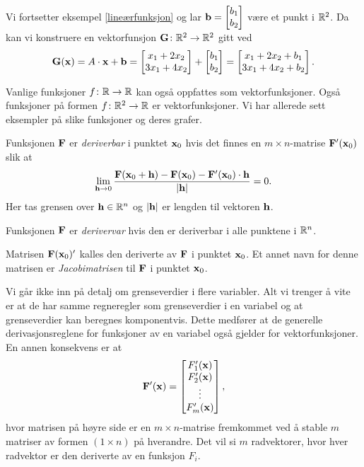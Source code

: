 \begin{eksempel}\label{affinfunksjon}
  Vi fortsetter eksempel \ref{lineærfunksjon} og lar $\mathbf{b} = \begin{bmatrix}b_1\\b_2\end{bmatrix}$
  være et punkt i $\mathbb{R}^2$.
  Da kan vi konstruere en vektorfunsjon $\mathbf{G} \colon \mathbb{R}^2 \to \mathbb{R}^2$ gitt ved
  $$\mathbf{G}(\mathbf{x}) = A \cdot \mathbf{x} + \mathbf{b} = \begin{bmatrix} x_1 + 2x_2 \\ 3x_1 + 4x_2
    \end{bmatrix} + \begin{bmatrix} b_1 \\ b_2 \end{bmatrix} = \begin{bmatrix}
  x_1 + 2x_2 + b_1 \\ 3x_1 + 4x_2 + b_2 \end{bmatrix}.$$
\end{eksempel}
\begin{eksempel}
  Vanlige funksjoner $f \colon \mathbb{R} \to \mathbb{R}$ kan også oppfattes som vektorfunksjoner. Også funksjoner på formen
  $f \colon \mathbb{R}^2 \to \mathbb{R}$ er vektorfunksjoner. Vi har allerede sett eksempler på slike funksjoner og deres grafer.
\end{eksempel}
\begin{definisjon}
  Funksjonen $\mathbf{F}$ er {\em deriverbar} i punktet $\mathbf{x}_0$ hvis det finnes en $m \times n$-matrise $\mathbf{F}'(\mathbf{x}_0)$ slik at
$$\lim_{\mathbf{h}\to 0} \frac{\mathbf{F}(\mathbf{x}_0+\mathbf{h}) - \mathbf{F}(\mathbf{x}_0) -
\mathbf{F}'(\mathbf{x}_0) \cdot \mathbf{h}}{|\mathbf{h}|} = 0.$$
Her tas grensen over $\mathbf{h} \in \mathbb{R}^n$ og $| \mathbf{h}|$ er lengden til vektoren $\mathbf{h}$.

Funksjonen $\mathbf{F}$ er {\em derivervar} hvis den er deriverbar i alle punktene i
$\mathbb{R}^n$.

Matrisen $\mathbf{F}(\mathbf{x}_0)'$ kalles den deriverte av $\mathbf{F}$ i punktet $\mathbf{x}_0$. Et annet
navn for denne matrisen er {\em Jacobimatrisen} til $\mathbf{F}$ i punktet $\mathbf{x}_0$.
\end{definisjon}


Vi går ikke inn på detalj om grenseverdier i flere variabler. Alt vi trenger å
vite er at de har samme regneregler som
grenseverdier i en variabel og at grenseverdier kan beregnes komponentvis.
Dette medfører at de generelle derivasjonsreglene for funksjoner av en variabel også gjelder for vektorfunksjoner.
En annen konsekvens er at 
$$\mathbf{F}'(\mathbf{x}) = \begin{bmatrix} F'_1(\mathbf{x}) \\ F'_2(\mathbf{x})
\\ \vdots \\ F'_m(\mathbf{x}) \end{bmatrix},$$
hvor matrisen på høyre side er en $m \times n$-matrise fremkommet ved å stable
$m$ matriser av formen $(1 \times n)$ på hverandre.
Det vil si $m$ radvektorer, hvor hver radvektor er den deriverte av en funksjon $F_i$.

